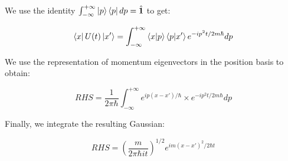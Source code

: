 
We use the identity $\int_{-\infty}^{+\infty} \ket{p}\bra{p} dp = \hat{\textbf{1}}$ to get:

\begin{equation}
   \bra{x} U(t) \ket{x'} = \int_{-\infty}^{+\infty} \braket{x}{p}\braket{p}{x'} e^{-ip^2t/2m\hbar} dp
\end{equation}

We use the representation of momentum eigenvectors in the position basis to obtain:

\begin{equation}
   RHS = \frac{1}{2 \pi \hbar} \int_{-\infty}^{+\infty} e^{ip(x-x')/\hbar} \times e^{-ip^2t/2m\hbar} dp
\end{equation}

Finally, we integrate the resulting Gaussian:

\begin{equation}
   RHS = (\frac{m}{2 \pi \hbar i t})^{1/2} e^{im(x-x')^2/2 \hbar t}
\end{equation}
